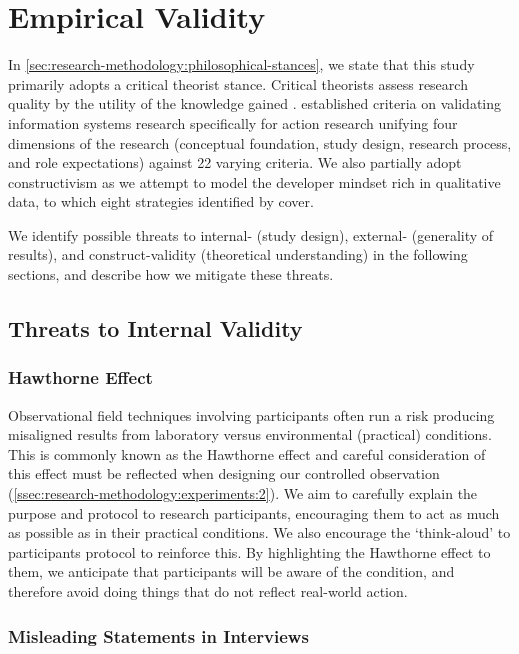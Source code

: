 \section{Empirical Validity}
\label{sec:research-methodology:empirical-validity}

In \cref{sec:research-methodology:philosophical-stances}, we state that this study primarily adopts a critical theorist stance. Critical theorists assess research quality by the utility of the knowledge gained \citep{Easterbrook:2007ws}. \citet{Lau:1999vs} established criteria on validating information systems research specifically for action research unifying four dimensions of the research (conceptual foundation, study design, research process, and role expectations) against 22 varying criteria. We also partially adopt constructivism as we attempt to model the developer mindset rich in qualitative data, to which eight strategies identified by \citet{Creswell:2017vn} cover.

We identify possible threats to internal- (study design), external- (generality of results), and construct-validity (theoretical understanding) in the following sections, and describe how we mitigate these threats.

\subsection{Threats to Internal Validity}

\subsubsection{Hawthorne Effect}

Observational field techniques involving participants often run a risk producing misaligned results from laboratory versus environmental (practical) conditions. This is commonly known as the Hawthorne effect \citep{Robbins:2014tr,Draper:vb} and careful consideration of this effect must be reflected when designing our controlled observation (\cref{ssec:research-methodology:experiments:2}). We aim to carefully explain the purpose and protocol to research participants, encouraging them to act as much as possible as in their practical conditions. We also encourage the `think-aloud' to participants protocol to reinforce this. By highlighting the Hawthorne effect to them, we anticipate that participants will be aware of the condition, and therefore avoid doing things that do not reflect real-world action.

\subsubsection{Misleading Statements in Interviews}

